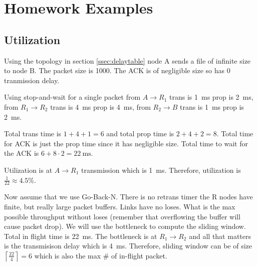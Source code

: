 \section{Homework Examples}
\subsection{Utilization}
Using the topology in section \ref{ssec:delaytable} node A sends a file
of infinite size to node B. The packet size is \qty{1000}{\byte}. The
ACK is of negligible size so has 0 tranmission delay.

Using stop-and-wait for a single packet from $A\to R_1$ trans is \qty{1}{\milli\second} prop
is \qty{2}{\milli\second}, from $R_1\to R_2$ trans is
\qty{4}{\milli\second} prop is \qty{4}{\milli\second}, from $R_2\to B$
trans is \qty{1}{\milli\second} prop is \qty{2}{\milli\second}.

Total trans time is $1+4+1=6$ and total prop time is $2+4+2=8$. Total
time for ACK is just the prop time since it has negligible size. Total
time to wait for the ACK is $6+8\cdot2 = \qty{22}{\milli\second}$.

Utilization is at $A\to R_1$ transmission which is
\qty{1}{\milli\second}. Therefore, utilization is $\frac{1}{22}\approx
4.5\%$.

Now assume that we use Go-Back-N. There is no retrans timer the R nodes
have finite, but really large packet buffers. Links have no loses. What
is the max possible throughput without loses (remember that overflowing
the buffer will cause packet drop). We will use the bottleneck to
compute the sliding window. Total in flight time is
\qty{22}{\milli\second}. The bottleneck is at $R_1\to R_2$ and all that
matters is the transmisison delay which is \qty{4}{\milli\second}.
Therefore, sliding window can be of size
$\left\lceil\frac{22}{4}\right\rceil=6$ which is also the max \# of
in-flight packet.
